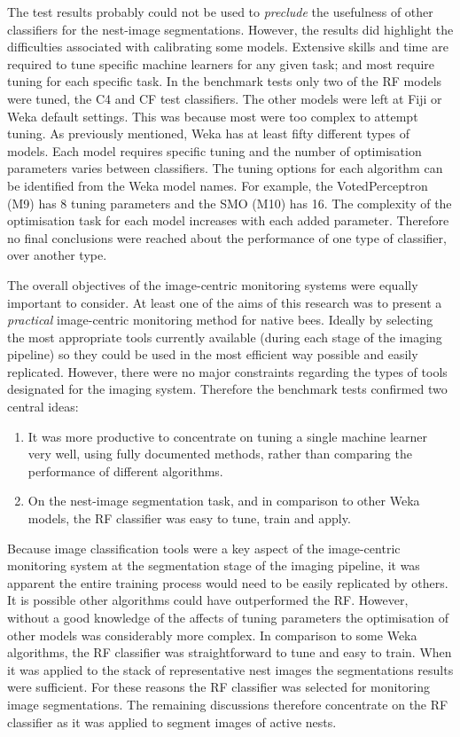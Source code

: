 The test results probably could not be used to \emph{preclude} the usefulness of other classifiers for the nest-image segmentations. However, the results did highlight the difficulties associated with calibrating some models. Extensive skills and time are required to tune specific machine learners for any given task; and most require tuning for each specific task. In the benchmark tests only two of the \ac{RF} models were tuned, the C4 and CF test classifiers.  The other models were left at \ac{Fiji} or \ac{Weka} default settings. This was because most were too complex to attempt tuning. As previously mentioned, Weka has at least fifty different types of models. Each model requires specific tuning and the number of optimisation parameters varies between classifiers. The tuning options for each algorithm can be identified from the Weka model  names. For example, the VotedPerceptron (M9) has 8 tuning parameters and the SMO (M10) has 16. The complexity of the optimisation task for each model increases with each added parameter. Therefore no final conclusions were reached about the performance of one type of classifier, over another type. 

The overall objectives of the image-centric monitoring systems were equally important to consider. At least one of the aims of this research was to present a \emph{practical} image-centric monitoring method for native bees. Ideally by selecting the most appropriate tools currently available (during each stage of the imaging pipeline) so they could be used in the most efficient way possible and easily replicated. However, there were no major constraints regarding the types of tools designated for the imaging system. Therefore the benchmark tests confirmed two central ideas:

\begin{enumerate}
\item It was more productive to concentrate on tuning a single machine learner very well, using fully documented methods, rather than comparing the performance of different algorithms.
\item On the nest-image segmentation task, and in comparison to other Weka models, the \ac{RF} classifier was easy to tune, train and apply.
\end{enumerate}

Because image classification tools were a key aspect of the image-centric monitoring system at the segmentation stage of the imaging pipeline, it was apparent the entire training process would need to be easily replicated by others. It is possible other algorithms could have outperformed the \ac{RF}. However, without a good knowledge of the affects of tuning parameters the optimisation of other models was considerably more complex. In comparison to some Weka algorithms, the \ac{RF} classifier was straightforward to tune and easy to train. When it was applied to the stack of representative nest images the segmentations results were sufficient. For these reasons the \ac{RF} classifier was selected for monitoring image segmentations. The remaining discussions therefore concentrate on the \ac{RF} classifier as it was applied to segment images of active nests.

